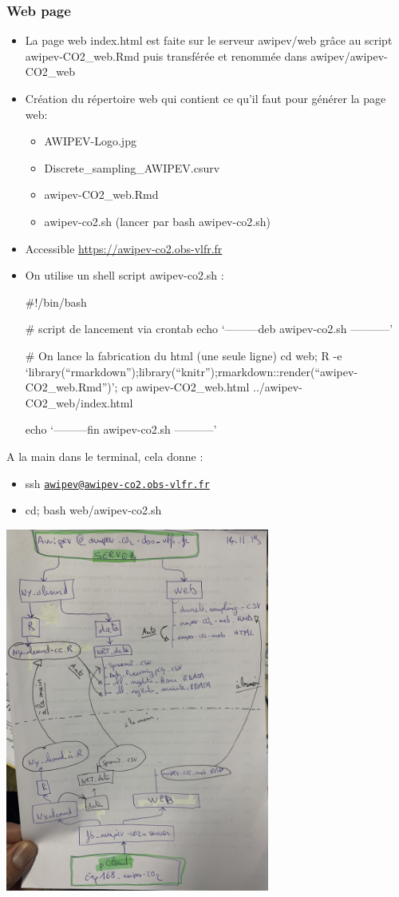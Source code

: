 \documentclass[
]{article}
\providecommand{\tightlist}{%
  \setlength{\itemsep}{0pt}\setlength{\parskip}{0pt}}
\begin{document}
\hypertarget{web-page}{%
\subsubsection{Web page}\label{web-page}}

\begin{itemize}
\item
  La page web index.html est faite sur le serveur awipev/web grâce au
  script awipev-CO2\_web.Rmd puis transférée et renommée dans
  awipev/awipev-CO2\_web
\item
  Création du répertoire web qui contient ce qu'il faut pour générer la
  page web:

  \begin{itemize}
  \tightlist
  \item
    AWIPEV-Logo.jpg
  \item
    Discrete\_sampling\_AWIPEV.csurv
  \item
    awipev-CO2\_web.Rmd
  \item
    awipev-co2.sh (lancer par bash awipev-co2.sh)
  \end{itemize}
\item
  Accessible \url{https://awipev-co2.obs-vlfr.fr}
\item
  On utilise un shell script awipev-co2.sh :

  \#!/bin/bash

  \# script de lancement via crontab echo `---------deb awipev-co2.sh
  -----------'

  \# On lance la fabrication du html (une seule ligne) cd web; R -e
  `library(``rmarkdown'');library(``knitr'');rmarkdown::render(``awipev-CO2\_web.Rmd'')';
  cp awipev-CO2\_web.html ../awipev-CO2\_web/index.html

  echo `---------fin awipev-co2.sh -----------'
\end{itemize}

A la main dans le terminal, cela donne :

\begin{itemize}
\tightlist
\item
  ssh
  \href{mailto:awipev@awipev-co2.obs-vlfr.fr}{\nolinkurl{awipev@awipev-co2.obs-vlfr.fr}}
\item
  cd; bash web/awipev-co2.sh
\end{itemize}

\includegraphics[width=0.65\textwidth,height=\textheight]{Images/awipev_server_arborescence.jpg}
\end{document}
